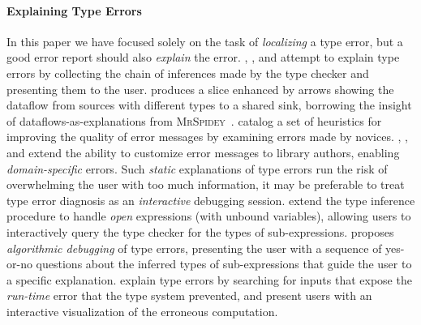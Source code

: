 \paragraph{Explaining Type Errors}
In this paper we have focused solely on the task of \emph{localizing} a
type error, but a good error report should also \emph{explain} the
error.
%
\citet{Wand1986-nw}, \citet{Beaven1993-hb}, and \citet{Duggan1996-by}
attempt to explain type errors by collecting the chain of inferences
made by the type checker %
and presenting them to the user.
%
%
\citet{Gast2004-zd} produces a slice enhanced by arrows
showing the dataflow from sources with different types to a
shared sink, borrowing the insight of dataflows-as-explanations from
\textsc{MrSpidey}~\citep{Flanagan1996-bu}.
%
\citet{Hage2006-hc} catalog a set of heuristics for
improving the quality of error messages by examining errors made by
novices.
%
\citet{Heeren2003-db}, \citet{Christiansen2014-qc}, and
\citet{Serrano2016-oo} extend the ability to customize error messages to
library authors, enabling \emph{domain-specific} errors.
%
Such \emph{static} explanations of type errors run the risk of
overwhelming the user with too much information, it may be preferable to
treat type error diagnosis as an \emph{interactive} debugging session.
%
\citet{Bernstein1995-yj} extend the type inference procedure to handle
\emph{open} expressions (\ie with unbound variables), allowing users to
interactively query the type checker for the types of sub-expressions.
%
\citet{Chitil2001-td} proposes \emph{algorithmic debugging} of type
errors, presenting the user with a sequence of yes-or-no questions about
the inferred types of sub-expressions that guide the user to a specific
explanation.
%
\citet{Seidel2016-ul} explain type errors by searching for inputs that
expose the \emph{run-time} error that the type system prevented, and
present users with an interactive visualization of the erroneous
computation.

